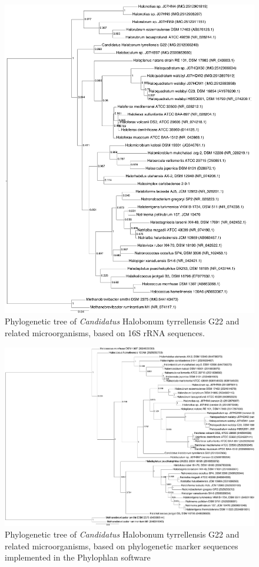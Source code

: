 \begin{figure}[!htbp]
	\centering
	\includegraphics[width=\textwidth]{Chapter1/Figures/HaloG22_16S_v2-2.pdf}
	\caption{Phylogenetic tree of \textit{Candidatus} Halobonum tyrrellensis G22 and related microorganisms, based on 16S rRNA sequences.}
	\label{G22_16Stree}
\end{figure}

\begin{figure}[!htbp]
	\centering
	\includegraphics[width=\textwidth]{Chapter1/Figures/HaloG22_v6.pdf}
	\caption{Phylogenetic tree of \textit{Candidatus} Halobonum tyrrellensis G22 and related microorganisms, based on phylogenetic marker sequences implemented in the Phylophlan software \cite{Segata:2013hb}}
	\label{G22_PhyloPhlanTree}
\end{figure}

